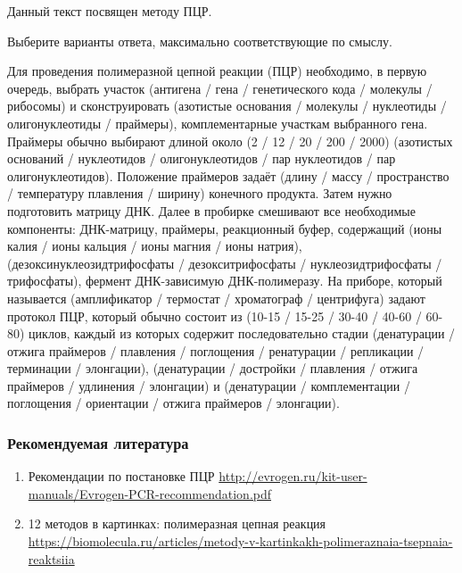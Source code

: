 
Данный текст посвящен методу ПЦР.

Выберите варианты ответа, максимально соответствующие по смыслу.

Для проведения полимеразной цепной реакции (ПЦР) необходимо, в первую очередь, выбрать участок 
(антигена / гена / генетического кода / молекулы / рибосомы) и сконструировать 
(азотистые основания / молекулы / нуклеотиды / олигонуклеотиды / праймеры), комплементарные участкам выбранного гена. Праймеры обычно выбирают длиной около 
(2 / 12 / 20 / 200 / 2000) (азотистых оснований / нуклеотидов / олигонуклеотидов / пар нуклеотидов / пар олигонуклеотидов). Положение праймеров задаёт 
(длину / массу / пространство / температуру плавления / ширину) конечного продукта. Затем нужно подготовить матрицу ДНК. Далее в пробирке смешивают все необходимые компоненты: ДНК-матрицу, праймеры, реакционный буфер, содержащий 
(ионы калия / ионы кальция / ионы магния / ионы натрия), (дезоксинуклеозидтрифосфаты / дезокситрифосфаты / нуклеозидтрифосфаты / трифосфаты), фермент ДНК-зависимую ДНК-полимеразу. На приборе, который называется 
(амплификатор / термостат / хроматограф / центрифуга) задают протокол ПЦР, который обычно состоит из 
(10-15 / 15-25 / 30-40 / 40-60 / 60-80)  циклов, каждый из которых содержит последовательно стадии 
(денатурации / отжига праймеров / плавления / поглощения / ренатурации / репликации / терминации / элонгации), 
(денатурации / достройки / плавления / отжига праймеров / удлинения / элонгации) и 
(денатурации / комплементации / поглощения / ориентации / отжига праймеров / элонгации).
\subsubsection*{Рекомендуемая литература}

\begin{enumerate}
    \item Рекомендации по постановке ПЦР \url{http://evrogen.ru/kit-user-manuals/Evrogen-PCR-recommendation.pdf}
    \item 12 методов в картинках: полимеразная цепная реакция \url{https://biomolecula.ru/articles/metody-v-kartinkakh-polimeraznaia-tsepnaia-reaktsiia}
\end{enumerate}